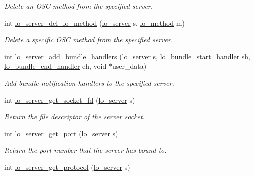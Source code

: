 \begin{DoxyCompactItemize}
\begin{DoxyCompactList}\small\item\em Delete an O\+S\+C method from the specified server. \end{DoxyCompactList}\item 
int \hyperlink{group__liblolowlevel_gabbeecd7e7f337906e13654b7f35253fd}{lo\+\_\+server\+\_\+del\+\_\+lo\+\_\+method} (\hyperlink{lo__types_8h_a59067bf50cf8abb4371da6f03c9036c9}{lo\+\_\+server} s, \hyperlink{lo__types_8h_a66faedf5da13231d8c0166870477dce5}{lo\+\_\+method} m)
\begin{DoxyCompactList}\small\item\em Delete a specific O\+S\+C method from the specified server. \end{DoxyCompactList}\item 
int \hyperlink{group__liblolowlevel_ga1411fdb0c8037a4dd3ab19af35df50ac}{lo\+\_\+server\+\_\+add\+\_\+bundle\+\_\+handlers} (\hyperlink{lo__types_8h_a59067bf50cf8abb4371da6f03c9036c9}{lo\+\_\+server} s, \hyperlink{lo__types_8h_a40484ab2ebc1413ffe465558a638d329}{lo\+\_\+bundle\+\_\+start\+\_\+handler} sh, \hyperlink{lo__types_8h_a3074807a4e7379c1b101c303567b7e42}{lo\+\_\+bundle\+\_\+end\+\_\+handler} eh, void $\ast$user\+\_\+data)
\begin{DoxyCompactList}\small\item\em Add bundle notification handlers to the specified server. \end{DoxyCompactList}\item 
int \hyperlink{group__liblolowlevel_gae11ca5a5b4ec2943d5a04642ba5052ae}{lo\+\_\+server\+\_\+get\+\_\+socket\+\_\+fd} (\hyperlink{lo__types_8h_a59067bf50cf8abb4371da6f03c9036c9}{lo\+\_\+server} s)
\begin{DoxyCompactList}\small\item\em Return the file descriptor of the server socket. \end{DoxyCompactList}\item 
int \hyperlink{group__liblolowlevel_ga532ef6e1b8675b23e65dd19eeb648c1d}{lo\+\_\+server\+\_\+get\+\_\+port} (\hyperlink{lo__types_8h_a59067bf50cf8abb4371da6f03c9036c9}{lo\+\_\+server} s)
\begin{DoxyCompactList}\small\item\em Return the port number that the server has bound to. \end{DoxyCompactList}\item 
int \hyperlink{group__liblolowlevel_gab40a599fe8440512b18479dac333e89f}{lo\+\_\+server\+\_\+get\+\_\+protocol} (\hyperlink{lo__types_8h_a59067bf50cf8abb4371da6f03c9036c9}{lo\+\_\+server} s)

\end{DoxyCompactItemize}
